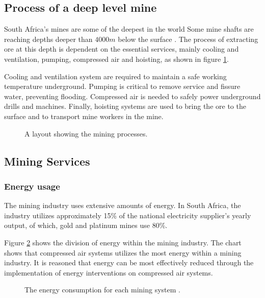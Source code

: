 	\subsection{Process of a deep level mine}
	South Africa's mines are some of the deepest in the world Some mine shafts are reaching depths deeper than $4000m$ below the surface \cite{vosloo2012case}. The process of extracting ore at this depth is dependent on the essential services, mainly cooling and ventilation, pumping, compressed air and hoisting, as shown in figure \ref{fig: Mining Layout}.
	\par 
	 Cooling and ventilation system are required to maintain a safe working temperature underground. Pumping is critical to remove service and fissure water, preventing flooding. Compressed air is needed to safely power underground drills and machines. Finally, hoisting systems are used to bring the ore to the surface and to transport mine workers in the mine. 
		\begin{figure}[h!]
			\centering
			\caption{A layout showing the mining processes.}
			\label{fig: Mining Layout}
		\end{figure}
	\subsection{Mining Services}
		\subsubsection{Energy usage}
			The mining industry uses extensive amounts of energy. In South Africa, the industry utilizes approximately 15\% of the national electricity supplier's yearly output, of which, gold and platinum mines use 80\%.\cite{Eskom2010Energy}
			\par
			Figure \ref{fig: Energy Split} shows the division of energy within the mining industry. The chart shows that compressed air systems utilizes the most energy within a mining industry. It is reasoned that energy can be most effectively reduced through the implementation of energy interventions on compressed air systems.
			\begin{figure}[h]
				\centering
				\fbox{}
				\caption[The energy consumption for each mining system.]{The energy consumption for each mining system \cite{le2005energy}.}
				\label{fig: Energy Split}
			\end{figure}

